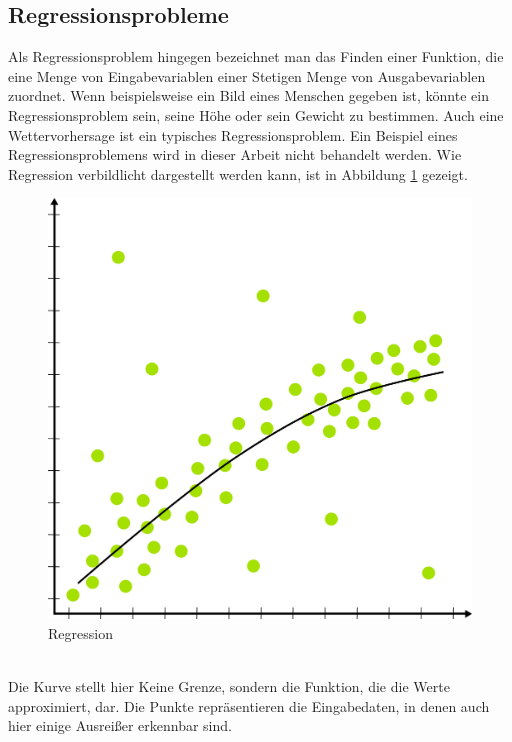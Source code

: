 \documentclass{article}
\begin{document}
\subsection{Regressionsprobleme}
Als Regressionsproblem hingegen bezeichnet man das Finden einer Funktion, die eine Menge von Eingabevariablen einer Stetigen Menge von Ausgabevariablen zuordnet. Wenn beispielsweise ein Bild eines Menschen gegeben ist, könnte ein Regressionsproblem sein, seine Höhe oder sein Gewicht zu bestimmen. Auch eine Wettervorhersage ist ein typisches Regressionsproblem. Ein Beispiel eines Regressionsproblemens wird in dieser Arbeit nicht behandelt werden. Wie Regression verbildlicht dargestellt werden kann, ist in Abbildung \ref{Regression} gezeigt.
\begin{figure}[h]
	\centering
	\includegraphics[width=0.4\linewidth]{../graphics/Regression.png}
	\caption{Regression}
	\label{Regression}
\end{figure}
\\
Die Kurve stellt hier Keine Grenze, sondern die Funktion, die die Werte approximiert, dar. Die Punkte repräsentieren die Eingabedaten, in denen auch hier einige Ausreißer erkennbar sind.
\end{document}
